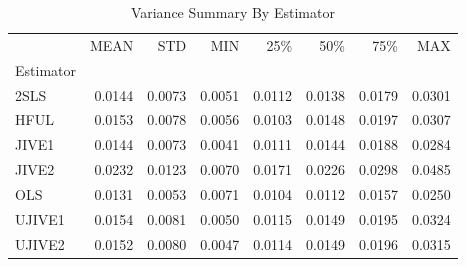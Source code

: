 \begin{table}[ht]
\centering
\caption{Variance Summary By Estimator}
\begin{tabular}{lrrrrrrr}
\toprule
 & MEAN & STD & MIN & 25\% & 50\% & 75\% & MAX \\
Estimator &  &  &  &  &  &  &  \\
\midrule
2SLS & 0.0144 & 0.0073 & 0.0051 & 0.0112 & 0.0138 & 0.0179 & 0.0301 \\
HFUL & 0.0153 & 0.0078 & 0.0056 & 0.0103 & 0.0148 & 0.0197 & 0.0307 \\
JIVE1 & 0.0144 & 0.0073 & 0.0041 & 0.0111 & 0.0144 & 0.0188 & 0.0284 \\
JIVE2 & 0.0232 & 0.0123 & 0.0070 & 0.0171 & 0.0226 & 0.0298 & 0.0485 \\
OLS & 0.0131 & 0.0053 & 0.0071 & 0.0104 & 0.0112 & 0.0157 & 0.0250 \\
UJIVE1 & 0.0154 & 0.0081 & 0.0050 & 0.0115 & 0.0149 & 0.0195 & 0.0324 \\
UJIVE2 & 0.0152 & 0.0080 & 0.0047 & 0.0114 & 0.0149 & 0.0196 & 0.0315 \\
\bottomrule
\end{tabular}
\end{table}
